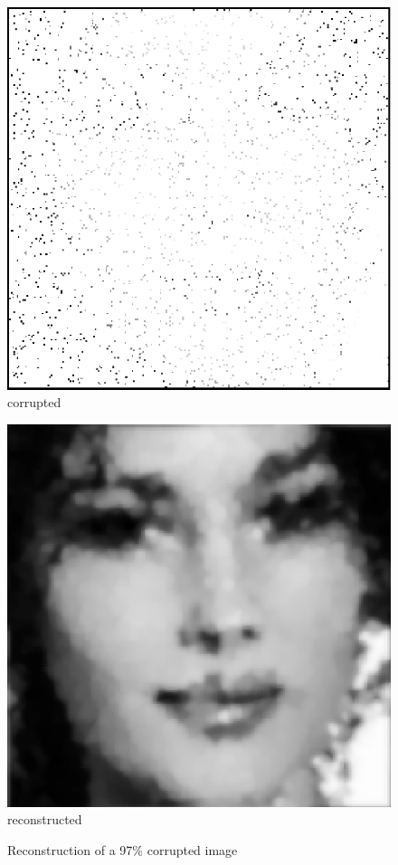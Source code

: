\documentclass[american,]{article}
\theoremstyle{definition}
\theoremstyle{definition}
\theoremstyle{definition}
\theoremstyle{remark}
\begin{document}
\begin{figure}[H]
\begin{minipage}{0.3\linewidth}
        \includegraphics[width=\textwidth]{img/img_corrupted.png}\\corrupted
    \end{minipage}\hfill%
    \begin{minipage}{0.3\linewidth}
        \centering
        \includegraphics[width=\textwidth]{img/img_reconstructed.png}\\reconstructed
    \end{minipage}
    \caption{Reconstruction of a 97\% corrupted image}
    \label{fig:img-reconstruct}
\end{figure}
\end{document}
